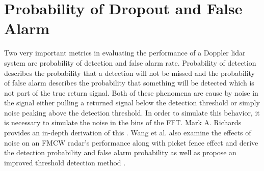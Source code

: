 \section{Probability of Dropout and False Alarm}
Two very important metrics in evaluating the performance of a Doppler lidar system are probability
of detection and false alarm rate. Probability of detection describes the probability that a detection
will not be missed and the probability of false alarm describes the probability that something will be
detected which is not part of the true return signal. Both of these phenomena are cause by noise in the signal
either pulling a returned signal below the detection threshold or simply noise peaking above the detection 
threshold. In order to simulate this behavior, it is necessary to simulate the noise in the bins of the FFT. Mark A. Richards
provides an in-depth derivation of this \cite{richards2007dftnoise}. Wang et al. also examine the effects
of noise on an FMCW radar's performance along with picket fence effect and derive the detection probability
and false alarm probability as well as propose an improved threshold detection method \cite{wangThresh}. 